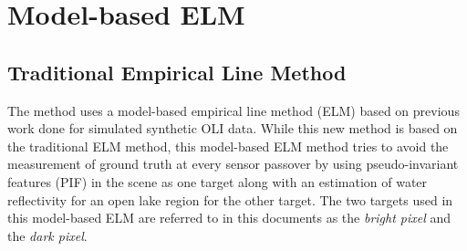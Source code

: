 \documentclass[]{spie}  %
\begin{document}
\section{Model-based ELM} 

\subsection{Traditional Empirical Line Method}
The method uses a model-based empirical line method (ELM) based on previous work done for simulated synthetic OLI data\cite{Gerace:2013,Gerace:2012}. While this new method is based on the traditional ELM method, this model-based ELM method tries to avoid the measurement of ground truth at every sensor passover by using pseudo-invariant features (PIF) in the scene as one target along with an estimation of water reflectivity for an open lake region for the other target. The two targets used in this model-based ELM are referred to in this documents as the {\it bright pixel} and the {\it dark pixel}.
\end{document}
